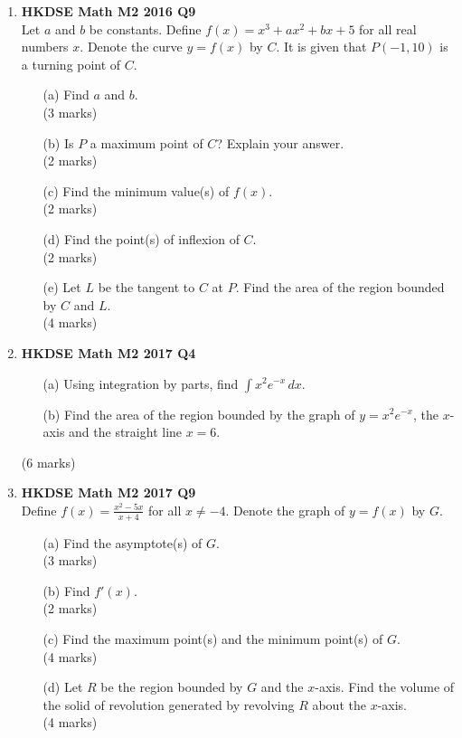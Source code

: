 \documentclass{report}
\begin{document}
\begin{enumerate}
	\item \textbf{HKDSE Math M2 2016 Q9}\\
	Let $a$ and $b$ be constants. Define $f(x) = x^3 + ax^2 + bx + 5$ for all real numbers $x$. Denote the curve $y = f(x)$ by $C$. It is given that $P(-1,10)$ is a turning point of $C$.
	\begin{enumerate}
		\item [(a)]Find $a$ and $b$.\\(3 marks)
		\item [(b)]Is $P$ a maximum point of $C$? Explain your answer. \\(2 marks)
		\item [(c)]Find the minimum value(s) of $f(x)$. \\(2 marks)
		\item [(d)]Find the point(s) of inflexion of $C$. \\(2 marks)
		\item [(e)]Let $L$ be the tangent to $C$ at $P$. Find the area of the region bounded by $C$ and $L$. \\(4 marks)
	\end{enumerate}
	
	\item \textbf{HKDSE Math M2 2017 Q4}	
	\begin{enumerate}
		\item [(a)]Using integration by parts, find $\displaystyle\int x^2 e^{-x} \,dx$. 
		\item [(b)]Find the area of the region bounded by the graph of $y = x^2 e^{-x}$, the $x$-axis and the straight line $x = 6$.
	\end{enumerate}
	(6 marks)

	\newpage

	\item \textbf{HKDSE Math M2 2017 Q9}\\
	Define $f(x) = \displaystyle\frac{x^2 - 5x}{x + 4}$ for all $x \neq -4$. Denote the graph of $y = f(x)$ by $G$. 
	\begin{enumerate}
		\item [(a)]Find the asymptote(s) of $G$.  \\(3 marks)
		\item [(b)]Find $f'(x)$. \\(2 marks) 
		\item [(c)]Find the maximum point(s) and the minimum point(s) of $G$. \\(4 marks) 
		\item [(d)]Let $R$ be the region bounded by $G$ and the $x$-axis. Find the volume of the solid of revolution generated by revolving $R$ about the $x$-axis. \\(4 marks)
	\end{enumerate}


\end{enumerate}
\end{document}
